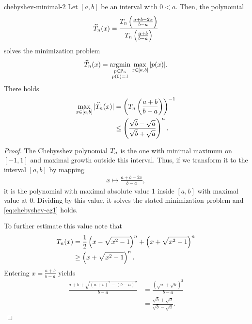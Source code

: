 \begin{Corollary}{chebyshev-minimal-2}
  Let $[a,b]$ be an interval with $0 < a$. Then, the polynomial
  \begin{gather}
    \widehat \pchebyshev_n(x)
    = \frac{\pchebyshev_n\left(\frac{a+b-2x}{b-a}\right)}%
    {\pchebyshev_n\left(\frac{a+b}{b-a}\right)}
  \end{gather}
  solves the minimization problem
  \begin{gather}
    \widehat {T}_n(x)
    = \operatorname*{argmin}_{\substack{p\in\mathbb P_n\\p(0) = 1}}
    \max_{x\in[a,b]}{\lvert p(x)\rvert}.
  \end{gather}
  There holds
  \begin{align}
    \label{eq:chebyshev-cg1}
    \max_{x\in[a,b]}{\lvert\widehat {T}_n(x)\rvert}
    &= \left(T_n\left(\frac{a+b}{b-a}\right)\right)^{-1}\\
    & \le \left(\frac{\sqrt b-\sqrt a}{\sqrt b + \sqrt a}\right)^n.
  \end{align}
\end{Corollary}

\begin{proof}
  The Chebysshev polynomial $T_n$ is the one with minimal maximum on $[-1,1]$ and maximal growth outside this interval. Thus, if we transform it to the interval $[a,b]$ by mapping
  \begin{gather}
    x \mapsto \frac{a+b-2x}{b-a},
  \end{gather}
  it is the polynomial with maximal absolute value 1 inside $[a,b]$
  with maximal value at 0. Dividing by this value, it solves the
  stated minimization problem and \eqref{eq:chebyshev-cg1} holds.

  To further estimate this value note that
  \begin{align}
    T_n(x)
    &= \frac12
      \left(x-\sqrt{x^2-1}\right)^n
      +
      \left(x+\sqrt{x^2-1}\right)^n\\
    &\ge \left(x+\sqrt{x^2-1}\right)^n.
  \end{align}
  Entering $x = \frac{a+b}{b-a}$ yields
  \begin{align}
    \frac{a+b+\sqrt{(a+b)^2-(b-a)^2}}{b-a}
    &= \frac{(\sqrt a + \sqrt b)^2}{b-a}\\
    &= \frac{\sqrt b + \sqrt a}{\sqrt b-\sqrt a}.
  \end{align}
\end{proof}



\printindex

